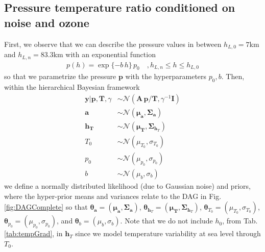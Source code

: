 \subsection{Pressure temperature ratio conditioned on noise and ozone}
\label{subsec:PressTempSetup}
First, we observe that we can describe the pressure values in between $h_{L,0}=7$km and $h_{L,n} = 83.3$km with an exponential function
\begin{align}
	p(h) =
	\exp{ \{ -b \, h  \} } \,  p_0 \quad ,h_{L,n}  \leq h \leq h_{L,0}
	\label{eq:pressFunc}
\end{align}
so that we parametrize the pressure $\bm{p}$ with the hyperparameters $p_0,b$.
Then, within the hierarchical Bayesian framework
\begin{subequations}
	\begin{align}
		\bm{y} |  \bm{p}, \bm{T}, \gamma &\sim \mathcal{N}(\bm{A} \, \bm{p}/\bm{T}, \gamma^{-1} \bm{I}) \label{eq:likelihoodPT} \\
		\bm{a}  &\sim \mathcal{N}(\bm{\mu}_{\bm{a}}, \bm{\Sigma}_{\bm{a}})\\
		\bm{h}_{\bm{T}}  &\sim \mathcal{N}(\bm{\mu}_{\bm{T}}, \bm{\Sigma}_{\bm{h}_T}) \\
		T_0  &\sim \mathcal{N}(\mu_{T_0}, \sigma_{T_0} )\\
		p_0  &\sim \mathcal{N}(\mu_{p_0}, \sigma_{p_0} )\\
		b  &\sim \mathcal{N}(\mu_b, \sigma_b )
	\end{align}
	\label{eq:BayMode}
\end{subequations}
we define a normally distributed likelihood (due to Gaussian noise) and priors, where the hyper-prior means and variances relate to the DAG in Fig. \ref{fig:DAGComplete} so that $\bm{\theta}_{\bm{a}} =(\bm{\mu}_{\bm{a}}, \bm{\Sigma}_{\bm{a}})$, $\bm{\theta}_{\bm{h}_T} = (\bm{\mu}_{\bm{T}}, \bm{\Sigma}_{\bm{h}_T}) $, 
$\bm{\theta}_{T_0} = (\mu_{T_0}, \sigma_{T_0})$, $\bm{\theta}_{p_0} = (\mu_{p_0}, \sigma_{p_0})$, and $\bm{\theta}_{b} = (\mu_{b}, \sigma_{b})$.
Note that we do not include $h_0$, from Tab. \ref{tab:tempGrad}, in $\bm{h}_T$ since we model temperature variability at sea level through $T_0$.

